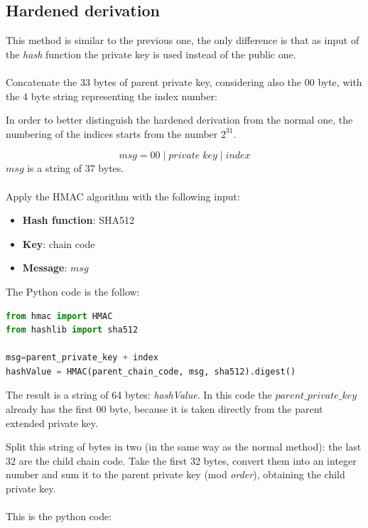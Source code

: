 \subsection{Hardened derivation}
This method is similar to the previous one, the only difference is that as input of the \textit{hash} function the private key is used instead of the public one. \\ \\
Concatenate the 33 bytes of parent private key, considering also the $00$ byte, with the 4 byte string representing the index number:

\begin{remark}
In order to better distinguish the hardened derivation from the normal one, the numbering of the indices starts from the number $2^{31}.$
\end{remark} 
\begin{equation*}
msg = 00 \;|\; private\;key \;|\; index
\end{equation*}
$msg$ is a string of $37$ bytes. \\ \\
Apply the HMAC algorithm with the following input:

\begin{itemize}[label=$\odot$]
	\item \textbf{Hash function}: SHA512
	\item \textbf{Key}: chain code
	\item \textbf{Message}: $msg$
\end{itemize}
The Python code is the follow:
\begin{lstlisting}[language=Python]
from hmac import HMAC
from hashlib import sha512

msg=parent_private_key + index
hashValue = HMAC(parent_chain_code, msg, sha512).digest()
\end{lstlisting}
\begin{flushleft}
	The result is a string of 64 bytes: \textit{hashValue}. In this code the $parent\_private\_key$ already has the first $00$ byte, because it is taken directly from the parent extended private key.
\end{flushleft}
Split this string of bytes in two (in the same way as the normal method): the last 32 are the child chain code. Take the first 32 bytes, convert them into an integer number and sum it to the parent private key (mod \textit{order}), obtaining the child private key.\\ \\
This is the python code:

